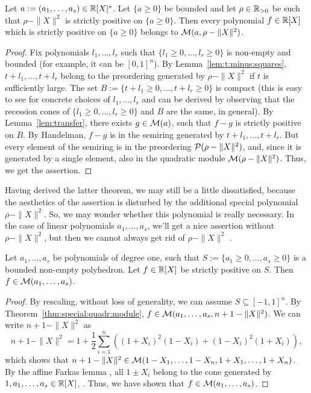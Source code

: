 \begin{theorem}
	\label{thm:special:quadr:module}
	Let $a:=(a_1,\ldots,a_s) \in \mathbb{R}[X]^s$. Let $\{ a \ge 0\}$ be bounded and let $\rho \in \mathbb{R}_{>0}$ be such that $\rho - \|X\|^2$ is strictly positive on $\{a \ge 0\}$. Then every polynomial $f \in \mathbb{R}[X]$ which is strictly positive on $\{a \ge 0\}$ belongs to $\mathcal{M}(a,\rho-\|X\|^2)$. 
\end{theorem}
\begin{proof}
		Fix  polynomials $l_1,\ldots,l_r$ such that $\{l_1 \ge 0,\ldots,l_r \ge 0\}$ is non-empty and bounded (for example, it can be $[0,1]^n$). By Lemma~\ref{lem:t:minus:squares}, $t+l_1,\ldots, t+ l_r$ belong to the preordering generated by $\rho - \|X\|^2$ if $t$ is sufficiently large. The set $B:= \{t + l_1 \ge 0,\ldots, t+ l_r \ge 0\}$ is compact (this is easy to see for concrete choices of $l_1,\ldots,l_r$ and can be derived by observing that the recession cones of $\{l_1 \ge 0,\ldots, l_r \ge 0\}$ and $B$ are the same, in general). By Lemma~\ref{lem:transfer}, there exists $g \in \mathcal{M}(a)$, such that $f - g$ is strictly positive on $B$. By Handelman, $f - g$ is in the semiring generated by $t+l_1,\ldots,t+l_r$. But every element of the semiring is in the preordering $\mathcal{P}(\rho-\|X\|^2)$, and, since it is generated by a single element, also in the quadratic module $\mathcal{M}(\rho-\|X\|^2)$. Thus, we get the assertion. 
\end{proof}

Having derived the latter theorem, we may still be a little dissatisfied, because the aesthetics of the assertion is disturbed by the additional special polynomial $\rho - \|X\|^2$. So, we may wonder whether this polynomial is really necessary. In the case of linear polynomials $a_1,\ldots,a_s$, we'll get a nice assertion without $\rho - \|X\|^2$, but then we cannot always get rid of $\rho - \|X\|^2$ .

\begin{theorem}
	Let $a_1,\ldots,a_s$ be polynomials of degree one, such that $S:=\{a_1 \ge 0,\ldots,a_s \ge 0\}$ is a bounded non-empty polyhedron. Let $f \in \mathbb{R}[X]$ be strictly positive on $S$. Then $f \in \mathcal{M}(a_1,\ldots,a_s)$. 
\end{theorem}
\begin{proof}
	By rescaling, without loss of generality, we can assume $S \subseteq [-1,1]^n$. By Theorem~\ref{thm:special:quadr:module}, $f  \in \mathcal{M}(a_1,\ldots,a_s,n+1 - \|X\|^2)$. We can write $n+1-\|X\|^2$ as 
	\[
		n+1-\|X\|^2 = 1 + \frac{1}{2} \sum_{i=1}^n ( (1+X_i)^2 (1-X_i) + (1-X_i)^2 (1+X_i)),
	\]
	which shows that $n+1-\|X\|^2 \in \mathcal{M}(1-X_1,\ldots,1-X_n,1+X_1,\ldots,1+X_n)$. By the affine Farkas lemma , all $1 \pm X_i$ belong to the cone generated by $1, a_1,\ldots,a_s \in \mathbb{R}[X]$, . Thus, we have shown that $f \in \mathcal{M}(a_1,\ldots,a_s)$. 
\end{proof}

